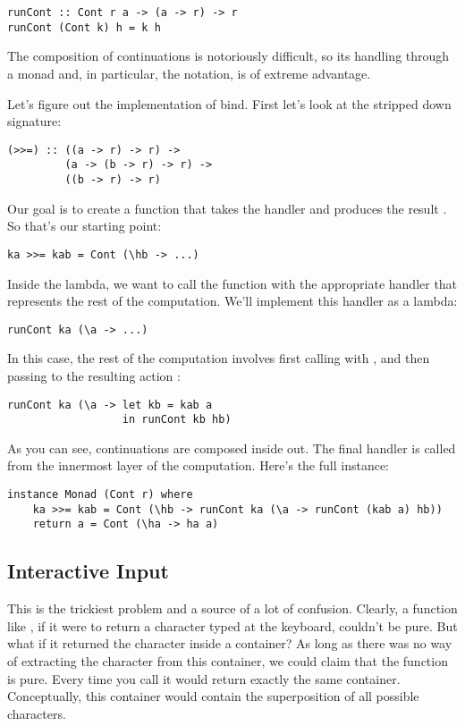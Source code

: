 \begin{verbatim}
runCont :: Cont r a -> (a -> r) -> r
runCont (Cont k) h = k h
\end{verbatim}
The composition of continuations is notoriously difficult, so its
handling through a monad and, in particular, the  notation,
is of extreme advantage.

Let's figure out the implementation of bind. First let's look at the
stripped down signature:

\begin{verbatim}
(>>=) :: ((a -> r) -> r) ->
         (a -> (b -> r) -> r) ->
         ((b -> r) -> r)
\end{verbatim}
Our goal is to create a function that takes the handler
 and produces the result . So
that's our starting point:

\begin{verbatim}
ka >>= kab = Cont (\hb -> ...)
\end{verbatim}
Inside the lambda, we want to call the function  with the
appropriate handler that represents the rest of the computation. We'll
implement this handler as a lambda:

\begin{verbatim}
runCont ka (\a -> ...)
\end{verbatim}
In this case, the rest of the computation involves first calling
 with , and then passing  to the
resulting action :

\begin{verbatim}
runCont ka (\a -> let kb = kab a 
                  in runCont kb hb)
\end{verbatim}
As you can see, continuations are composed inside out. The final handler
 is called from the innermost layer of the computation.
Here's the full instance:

\begin{verbatim}
instance Monad (Cont r) where
    ka >>= kab = Cont (\hb -> runCont ka (\a -> runCont (kab a) hb))
    return a = Cont (\ha -> ha a)
\end{verbatim}

\subsection{Interactive Input}\label{interactive-input}

This is the trickiest problem and a source of a lot of confusion.
Clearly, a function like , if it were to return a
character typed at the keyboard, couldn't be pure. But what if it
returned the character inside a container? As long as there was no way
of extracting the character from this container, we could claim that the
function is pure. Every time you call  it would return
exactly the same container. Conceptually, this container would contain
the superposition of all possible characters.

